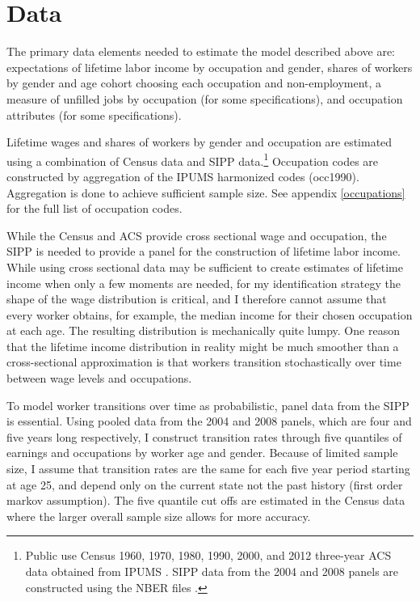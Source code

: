\documentclass[11pt]{article}
\begin{document}
\section{Data} \label{data}
The primary data elements needed to estimate the model described above are: expectations of lifetime labor income by occupation and gender, shares of workers by gender and age cohort choosing each occupation and non-employment, a measure of unfilled jobs by occupation (for some specifications), and occupation attributes (for some specifications).

Lifetime wages and shares of workers by gender and occupation are estimated using a combination of Census data and SIPP data.\footnote{Public use Census 1960, 1970, 1980, 1990, 2000, and 2012 three-year ACS data obtained from IPUMS \cite{IPUMSUSA}. SIPP data from the 2004 and 2008 panels are constructed using the NBER files \cite{SIPP}. } Occupation codes are constructed by aggregation of the IPUMS harmonized codes (occ1990). Aggregation is done to achieve sufficient sample size. See appendix \ref{occupations} for the full list of occupation codes.

While the Census and ACS provide cross sectional wage and occupation, the SIPP is needed to provide a panel for the construction of lifetime labor income. While using cross sectional data may be sufficient to create estimates of lifetime income when only a few moments are needed, for my identification strategy the shape of the wage distribution is critical, and I therefore cannot assume that every worker obtains, for example, the median income for their chosen occupation at each age. The resulting distribution is mechanically quite lumpy. One reason that the lifetime income distribution in reality might be much smoother than a cross-sectional approximation is that workers transition stochastically over time between wage levels and occupations.

To model worker transitions over time as probabilistic, panel data from the SIPP is essential. Using pooled data from the 2004 and 2008 panels, which are four and five years long respectively, I construct transition rates through five quantiles of earnings and occupations by worker age and gender. Because of limited sample size, I assume that transition rates are the same for each five year period starting at age 25, and depend only on the current state not the past history (first order markov assumption). The five quantile cut offs are estimated in the Census data where the larger overall sample size allows for more accuracy. 
\end{document}
